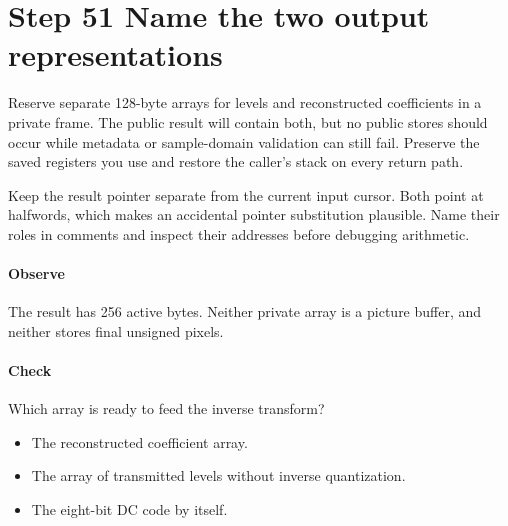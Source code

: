 \section{Step 51 Name the two output representations}\label{h263-quant-s01}
Reserve separate 128-byte arrays for levels and reconstructed coefficients in a
private frame. The public result will contain both, but no public stores should
occur while metadata or sample-domain validation can still fail. Preserve the
saved registers you use and restore the caller's stack on every return path.

Keep the result pointer separate from the current input cursor. Both point at
halfwords, which makes an accidental pointer substitution plausible. Name their
roles in comments and inspect their addresses before debugging arithmetic.

\paragraph{Observe} The result has 256 active bytes. Neither private array
is a picture buffer, and neither stores final unsigned pixels.
\paragraph{Check} Which array is ready to feed the inverse transform?
\begin{itemize}
  \item[A.] The reconstructed coefficient array.
  \item[B.] The array of transmitted levels without inverse quantization.
  \item[C.] The eight-bit DC code by itself.
\end{itemize}
